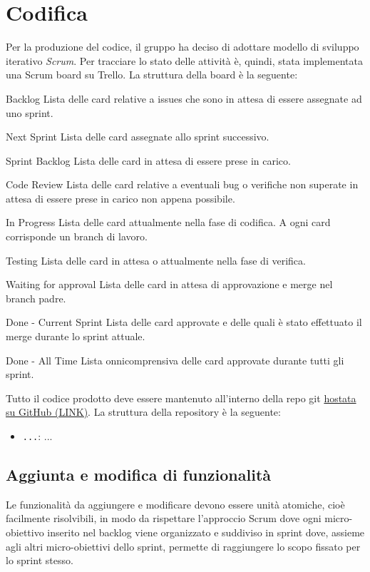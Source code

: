 \section{Codifica}

Per la produzione del codice, il gruppo ha deciso di adottare modello di sviluppo iterativo \textit{Scrum}. Per tracciare lo stato delle attività è, quindi, stata implementata una Scrum board su Trello.
La struttura della board è la seguente:
\begin{itemdescript}
    \item [Backlog] Lista delle card relative a issues che sono in attesa di essere assegnate ad uno sprint.
    \item [Next Sprint] Lista delle card assegnate allo sprint successivo. 
    \item [Sprint Backlog] Lista delle card in attesa di essere prese in carico.
    \item [Code Review] Lista delle card relative a eventuali bug o verifiche non superate in attesa di essere prese in carico non appena possibile.
    \item [In Progress] Lista delle card attualmente nella fase di codifica. A ogni card corrisponde un branch di lavoro.
    \item [Testing] Lista delle card in attesa o attualmente nella fase di verifica.
    \item [Waiting for approval] Lista delle card in attesa di approvazione e merge nel branch padre.
    \item [Done - Current Sprint] Lista delle card approvate e delle quali è stato effettuato il merge durante lo sprint attuale.
    \item [Done - All Time] Lista onnicomprensiva delle card approvate durante tutti gli sprint.
\end{itemdescript}
Tutto il codice prodotto deve essere mantenuto all'interno della repo git \href{}{hostata su GitHub (LINK)}.
La struttura della repository è la seguente:
\begin{itemize}
    \item \texttt{...}: ...
\end{itemize}

\subsection{Aggiunta e modifica di funzionalità}
Le funzionalità da aggiungere e modificare devono essere unità atomiche, cioè facilmente risolvibili, in modo da rispettare l'approccio Scrum dove ogni micro-obiettivo inserito nel backlog viene organizzato e suddiviso in sprint dove, assieme agli altri micro-obiettivi dello sprint, permette di raggiungere lo scopo fissato per lo sprint stesso.
